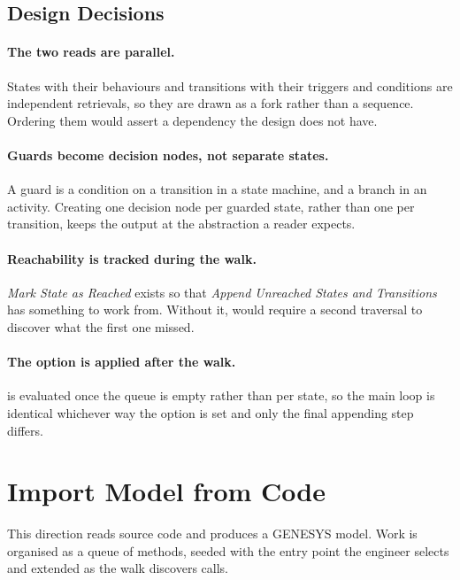 \subsection{Design Decisions}

\paragraph{The two reads are parallel.}
States with their behaviours and transitions with their triggers and conditions
are independent retrievals, so they are drawn as a fork rather than a sequence.
Ordering them would assert a dependency the design does not have.

\paragraph{Guards become decision nodes, not separate states.}
A guard is a condition on a transition in a state machine, and a branch in an
activity. Creating one decision node per guarded state, rather than one per
transition, keeps the output at the abstraction a reader expects.

\paragraph{Reachability is tracked during the walk.}
\emph{Mark State as Reached} exists so that \emph{Append Unreached States and
Transitions} has something to work from. Without it,  would require a
second traversal to discover what the first one missed.

\paragraph{The option is applied after the walk.}
 is evaluated once the queue is empty rather than per state, so the
main loop is identical whichever way the option is set and only the final
appending step differs.

\section{Import Model from Code}
\label{sec:import-activity}

This direction reads source code and produces a GENESYS model. Work is organised
as a queue of methods, seeded with the entry point the engineer selects and
extended as the walk discovers calls.



